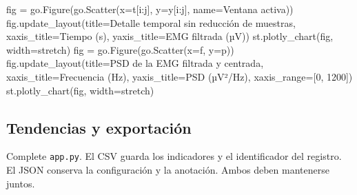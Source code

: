 \documentclass[
  spanish,
  10.5pt,
  a4paper,
  DIV=11,
  numbers=noendperiod]{scrartcl}
\newenvironment{Shaded}{\begin{snugshade}}{\end{snugshade}}
\newcommand{\DecValTok}[1]{\textcolor[rgb]{0.68,0.00,0.00}{#1}}
\newcommand{\NormalTok}[1]{\textcolor[rgb]{0.00,0.23,0.31}{#1}}
\newcommand{\OperatorTok}[1]{\textcolor[rgb]{0.37,0.37,0.37}{#1}}
\newcommand{\StringTok}[1]{\textcolor[rgb]{0.13,0.47,0.30}{#1}}
\begin{document}
\begin{Shaded}
\begin{Highlighting}[]
\NormalTok{fig }\OperatorTok{=}\NormalTok{ go.Figure(go.Scatter(x}\OperatorTok{=}\NormalTok{t[i:j], y}\OperatorTok{=}\NormalTok{y[i:j], name}\OperatorTok{=}\StringTok{\textquotesingle{}Ventana activa\textquotesingle{}}\NormalTok{))}
\NormalTok{fig.update\_layout(title}\OperatorTok{=}\StringTok{\textquotesingle{}Detalle temporal sin reducción de muestras\textquotesingle{}}\NormalTok{,}
\NormalTok{                  xaxis\_title}\OperatorTok{=}\StringTok{\textquotesingle{}Tiempo (s)\textquotesingle{}}\NormalTok{, yaxis\_title}\OperatorTok{=}\StringTok{\textquotesingle{}EMG filtrada (µV)\textquotesingle{}}\NormalTok{)}
\NormalTok{st.plotly\_chart(fig, width}\OperatorTok{=}\StringTok{\textquotesingle{}stretch\textquotesingle{}}\NormalTok{)}
\NormalTok{fig }\OperatorTok{=}\NormalTok{ go.Figure(go.Scatter(x}\OperatorTok{=}\NormalTok{f, y}\OperatorTok{=}\NormalTok{p))}
\NormalTok{fig.update\_layout(title}\OperatorTok{=}\StringTok{\textquotesingle{}PSD de la EMG filtrada y centrada\textquotesingle{}}\NormalTok{,}
\NormalTok{                  xaxis\_title}\OperatorTok{=}\StringTok{\textquotesingle{}Frecuencia (Hz)\textquotesingle{}}\NormalTok{, yaxis\_title}\OperatorTok{=}\StringTok{\textquotesingle{}PSD (µV²/Hz)\textquotesingle{}}\NormalTok{,}
\NormalTok{                  xaxis\_range}\OperatorTok{=}\NormalTok{[}\DecValTok{0}\NormalTok{, }\DecValTok{1200}\NormalTok{])}
\NormalTok{st.plotly\_chart(fig, width}\OperatorTok{=}\StringTok{\textquotesingle{}stretch\textquotesingle{}}\NormalTok{)}
\end{Highlighting}
\end{Shaded}

\subsection{Tendencias y exportación}\label{tendencias-y-exportaciuxf3n}

Complete \texttt{app.py}. El CSV guarda los indicadores y el
identificador del registro. El JSON conserva la configuración y la
anotación. Ambos deben mantenerse juntos.
\end{document}
